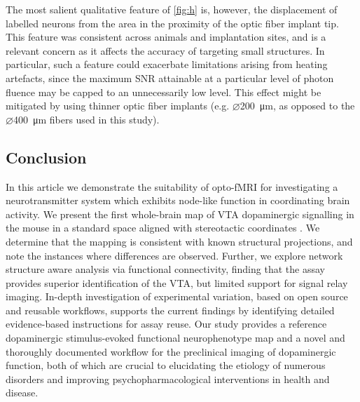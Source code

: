 The most salient qualitative feature of \cref{fig:h} is, however, the displacement of labelled neurons from the area in the proximity of the optic fiber implant tip.
This feature was consistent across animals and implantation sites, and is a relevant concern as it affects the accuracy of targeting small structures.
In particular, such a feature could exacerbate limitations arising from heating artefacts, since the maximum SNR attainable at a particular level of photon fluence may be capped to an unnecessarily low level.
This effect might be mitigated by using thinner optic fiber implants (e.g. $\diameter$\SI{200}{\micro\meter}, as opposed to the $\diameter$\SI{400}{\micro\meter} fibers used in this study).

\subsection{Conclusion}

In this article we demonstrate the suitability of opto-fMRI for investigating a neurotransmitter system which exhibits node-like function in coordinating brain activity.
We present the first whole-brain map of VTA dopaminergic signalling in the mouse in a standard space aligned with stereotactic coordinates \cite{me}.
We determine that the mapping is consistent with known structural projections, and note the instances where differences are observed.
Further, we explore network structure aware analysis via functional connectivity, finding that the assay provides superior identification of the VTA, but limited support for signal relay imaging.
In-depth investigation of experimental variation, based on open source and reusable workflows, supports the current findings by identifying detailed evidence-based instructions for assay reuse.
Our study provides a reference dopaminergic stimulus-evoked functional neurophenotype map and a novel and thoroughly documented workflow for the preclinical imaging of dopaminergic function, both of which are crucial to elucidating the etiology of numerous disorders and improving psychopharmacological interventions in health and disease.
